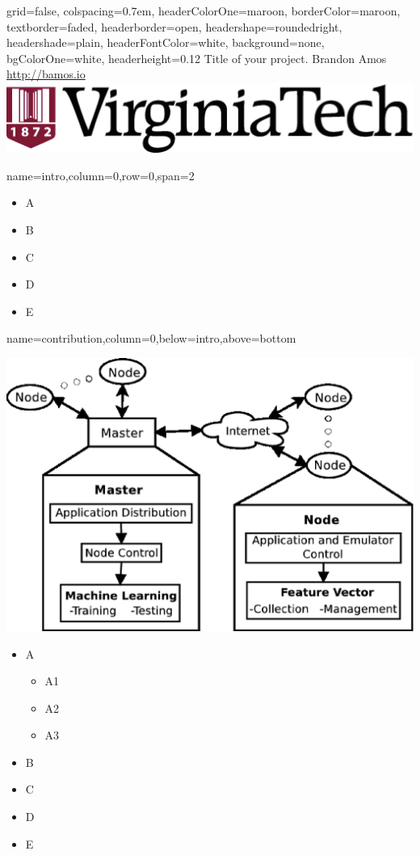 \documentclass[landscape,specialSize,fontscale=0.3]{baposter}
\begin{document}
\begin{poster}{
  grid=false, %
  colspacing=0.7em, %
  headerColorOne=maroon, borderColor=maroon, %
  textborder=faded, %
  headerborder=open, headershape=roundedright,
  headershade=plain, headerFontColor=white,
  background=none, bgColorOne=white,
  headerheight=0.12\textheight
}{
}{
  \sc\Huge Title of your project.
}{
  \vspace{2mm}
  Brandon Amos \\
  \url{http://bamos.io}
}{
  \includegraphics[height=0.05\textheight]{vtlogo-new}
}

    {name=intro,column=0,row=0,span=2}{
  \begin{itemize}
    \item A
    \item B
    \item C
    \item D
    \item E
  \end{itemize}
}

    {name=contribution,column=0,below=intro,above=bottom}{
  \includegraphics[width=\linewidth]{stream}
  \begin{itemize}
    \item A
    \begin{itemize}\item A1 \item A2 \item A3\end{itemize}
    \item B \item C \item D \item E
  \end{itemize}
}


\end{poster}
\end{document}
